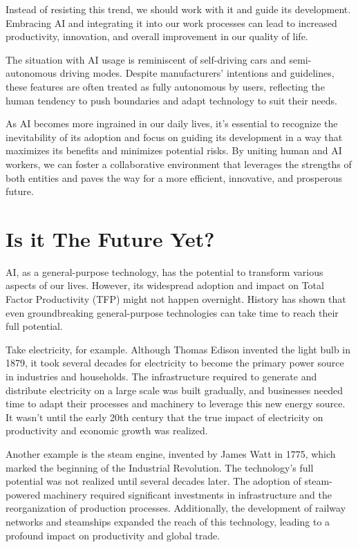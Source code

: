 Instead of resisting this trend, we should work with it and guide its development. Embracing AI and integrating it into our work processes can lead to increased productivity, innovation, and overall improvement in our quality of life.

The situation with AI usage is reminiscent of self-driving cars and semi-autonomous driving modes. Despite manufacturers' intentions and guidelines, these features are often treated as fully autonomous by users, reflecting the human tendency to push boundaries and adapt technology to suit their needs.

As AI becomes more ingrained in our daily lives, it's essential to recognize the inevitability of its adoption and focus on guiding its development in a way that maximizes its benefits and minimizes potential risks. By uniting human and AI workers, we can foster a collaborative environment that leverages the strengths of both entities and paves the way for a more efficient, innovative, and prosperous future. 

\section{Is it The Future Yet?}

AI, as a general-purpose technology, has the potential to transform various aspects of our lives. However, its widespread adoption and impact on Total Factor Productivity (TFP) might not happen overnight. History has shown that even groundbreaking general-purpose technologies can take time to reach their full potential.

Take electricity, for example. Although Thomas Edison invented the light bulb in 1879, it took several decades for electricity to become the primary power source in industries and households. The infrastructure required to generate and distribute electricity on a large scale was built gradually, and businesses needed time to adapt their processes and machinery to leverage this new energy source. It wasn't until the early 20th century that the true impact of electricity on productivity and economic growth was realized.

Another example is the steam engine, invented by James Watt in 1775, which marked the beginning of the Industrial Revolution. The technology's full potential was not realized until several decades later. The adoption of steam-powered machinery required significant investments in infrastructure and the reorganization of production processes. Additionally, the development of railway networks and steamships expanded the reach of this technology, leading to a profound impact on productivity and global trade.

